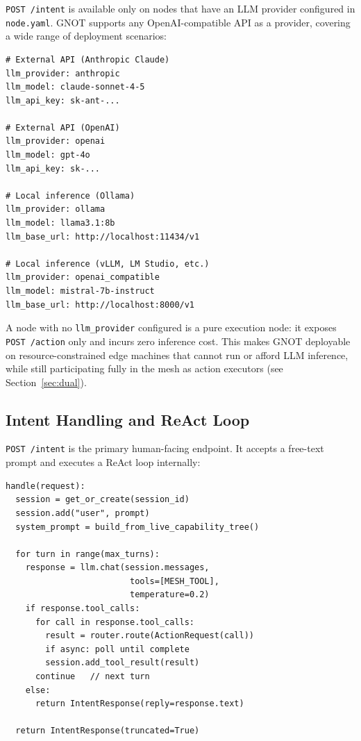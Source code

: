 \documentclass[10pt,twocolumn]{article}
\begin{document}
\texttt{POST /intent} is available only on nodes that have an LLM
provider configured in \texttt{node.yaml}. GNOT supports any
OpenAI-compatible API as a provider, covering a wide range of
deployment scenarios:

\begin{lstlisting}[caption={LLM provider configuration examples}]
# External API (Anthropic Claude)
llm_provider: anthropic
llm_model: claude-sonnet-4-5
llm_api_key: sk-ant-...

# External API (OpenAI)
llm_provider: openai
llm_model: gpt-4o
llm_api_key: sk-...

# Local inference (Ollama)
llm_provider: ollama
llm_model: llama3.1:8b
llm_base_url: http://localhost:11434/v1

# Local inference (vLLM, LM Studio, etc.)
llm_provider: openai_compatible
llm_model: mistral-7b-instruct
llm_base_url: http://localhost:8000/v1
\end{lstlisting}

A node with no \texttt{llm\_provider} configured is a pure execution
node: it exposes \texttt{POST /action} only and incurs zero inference
cost. This makes GNOT deployable on resource-constrained edge machines
that cannot run or afford LLM inference, while still participating
fully in the mesh as action executors (see Section~\ref{sec:dual}).

\subsection{Intent Handling and ReAct Loop}

\texttt{POST /intent} is the primary human-facing endpoint. It accepts a
free-text prompt and executes a ReAct loop internally:

\begin{lstlisting}[caption={ReAct loop pseudocode}]
handle(request):
  session = get_or_create(session_id)
  session.add("user", prompt)
  system_prompt = build_from_live_capability_tree()

  for turn in range(max_turns):
    response = llm.chat(session.messages,
                         tools=[MESH_TOOL],
                         temperature=0.2)
    if response.tool_calls:
      for call in response.tool_calls:
        result = router.route(ActionRequest(call))
        if async: poll until complete
        session.add_tool_result(result)
      continue   // next turn
    else:
      return IntentResponse(reply=response.text)

  return IntentResponse(truncated=True)
\end{lstlisting}
\end{document}
